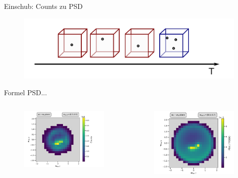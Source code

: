 \documentclass{beamer}
\begin{document}



\begin{frame}{Einschub: Counts zu PSD}
	\begin{figure}
	\includegraphics[scale=.4]{Pics/norm_time.pdf}
\end{figure}
Formel PSD...
\begin{columns}
	\column[]{5cm}
	\begin{figure}
		\includegraphics[scale=.3]{Pics/counts.pdf}
	\end{figure}
	\column[]{5cm}
	\begin{figure}
		\includegraphics[scale=.3]{Pics/psv.pdf}
	\end{figure}
	\end{columns}

\end{frame}
\end{document}
